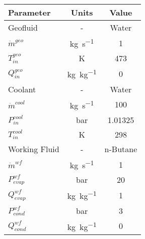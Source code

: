 \begin{tabular}{|p{3cm} c c|}
    \hline
    \rowcolor{bluepoli!40} %
    \textbf{Parameter} & \textbf{Units} & \textbf{Value} \T\B \\
    \hline \hline
    Geofluid & - & Water \T\B\\
    \(\Dot{m}^{geo}\)  & \unit{\kg\per\s} & \num{1} \T\B\\
    \(T_{in}^{geo}\) & \unit{\K} & \num{473} \T\B\\
    \(Q_{in}^{geo}\) & \unit{\kg\per\kg} & \num{0} \T\B\\
    \hline
    Coolant & - & Water \T\B\\
    \(\Dot{m}^{cool}\)  & \unit{\kg\per\s} & \num{100} \T\B\\
    \(P_{in}^{cool}\) & \unit{\bar} & \num{1.01325} \T\B\\
    \(T_{in}^{cool}\) & \unit{\K} & \num{298} \T\B\\
    \hline
    Working Fluid & - & n-Butane \T\B\\
    \(\Dot{m}^{wf}\)  & \unit{\kg\per\s} & \num{1} \T\B\\
    \(P_{evap}^{wf}\) & \unit{\bar} & \num{20} \T\B\\
    \(Q_{evap}^{wf}\) & \unit{\kg\per\kg} & \num{1} \T\B\\
    \(P_{cond}^{wf}\) & \unit{\bar} & \num{3} \T\B\\
    \(Q_{cond}^{wf}\) & \unit{\kg\per\kg} & \num{0} \T\B\\
    \hline
\end{tabular}
